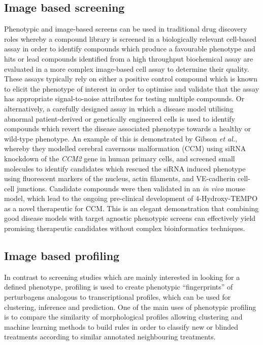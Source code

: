 \documentclass[a4paper,11pt,twoside,openright]{scrbook}
\begin{document}
\subsection{Image based screening}

Phenotypic and image-based screens can be used in traditional drug discovery roles whereby a compound library is 
screened in a biologically relevant cell-based assay in order to identify compounds which produce a favourable 
phenotype and hits or lead compounds identified from a high throughput biochemical assay are evaluated in a more 
complex image-based cell assay to determine their quality.
These assays typically rely on either a positive control compound which is known to elicit the phenotype of interest in 
order to optimise and validate that the assay has appropriate signal-to-noise attributes for testing multiple compounds.
Or alternatively, a carefully designed assay in which a disease model utilising abnormal patient-derived or genetically 
engineered cells is used to identify compounds which revert the disease associated phenotype towards a healthy or 
wild-type phenotype.
An example of this is demonstrated by Gibson \textit{et al.}, \cite{Gibson2015} whereby they modelled cerebral 
cavernous malformation (CCM) using siRNA knockdown of the \textit{CCM2} gene in human primary cells, and screened small 
molecules to identify candidates which rescued the siRNA induced phenotype using fluorescent markers of the nucleus, 
actin filaments, and VE-cadherin cell-cell junctions.
Candidate compounds were then validated in an \textit{in vivo} mouse model, which lead to the ongoing pre-clinical 
development of 4-Hydroxy-TEMPO as a novel therapeutic for CCM.
This is an elegant demonstration that combining good disease models with target agnostic phenotypic screens can 
effectively yield promising therapeutic candidates without complex bioinformatics techniques.


\subsection{Image based profiling}

In contrast to screening studies which are mainly interested in looking for a defined phenotype, profiling is used to 
create phenotypic ``fingerprints'' of perturbagens analogous to transcriptional profiles, which can be used for 
clustering, inference and prediction.
One of the main uses of phenotypic profiling is to compare the similarity of morphological profiles allowing clustering 
and machine learning methods to build rules in order to classify new or blinded treatments according to similar 
annotated neighbouring treatments.
\end{document}
